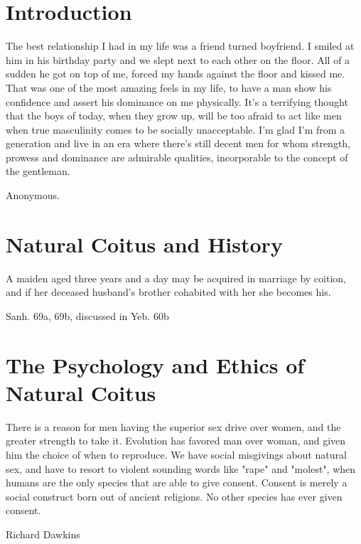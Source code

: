 

\chapter*{Introduction}
\epigraph{The best relationship I had in my life was a friend turned boyfriend. 
I smiled at him in his birthday party and we slept next to each other on the 
floor. All of a sudden he got on top of me, forced my hands against the floor 
and kissed me. That was one of the most amazing feels in my life, to have a man 
show his confidence and assert his dominance on me physically. It's a 
terrifying 
thought that the boys of today, when they grow up, will be too afraid to act 
like men when true masculinity comes to be socially unacceptable. I'm glad I'm 
from a generation and live in an era where there's still decent men for whom 
strength, prowess and dominance are admirable qualities, incorporable to the 
concept of the gentleman.}{Anonymous.}






%

\chapter{Natural Coitus and History}

\epigraph{A maiden aged three years and a day may be acquired in marriage by 
coition, and if her deceased husband’s brother cohabited with her she becomes 
his.}{Sanh. 69a, 69b, discussed in Yeb. 60b}



\chapter{The Psychology and Ethics of Natural Coitus}

\epigraph{There is a reason for men having the superior sex drive over women, 
and the 
greater strength to take it. Evolution has favored man over woman, and given 
him 
the choice of when to reproduce. We have social misgivings about natural sex, 
and have to resort to violent sounding words like "rape" and "molest", when 
humans are the only species that are able to give consent. Consent is merely a 
social construct born out of ancient religions. No other species has ever given 
consent.}{Richard Dawkins}

